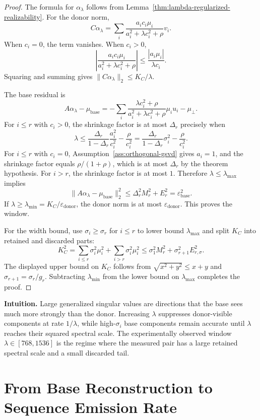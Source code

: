 \documentclass{article}
\theoremstyle{plain}
\theoremstyle{definition}
\theoremstyle{remark}
\begin{document}
\begin{proof}
The formula for $\alpha_\lambda$ follows from Lemma~\ref{thm:lambda-regularized-realizability}. For the donor norm,
\[
C\alpha_\lambda
=
\sum_i
\frac{a_ic_i\mu_i}{a_i^2+\lambda c_i^2+\rho}v_i.
\]
When $c_i=0$, the term vanishes. When $c_i>0$,
\[
\left|
\frac{a_ic_i\mu_i}{a_i^2+\lambda c_i^2+\rho}
\right|
\le
\frac{|a_i\mu_i|}{\lambda c_i}.
\]
Squaring and summing gives $\|C\alpha_\lambda\|_2\le K_C/\lambda$.

The base residual is
\[
A\alpha_\lambda-\mu_{\text{base}}
=
-
\sum_i
\frac{\lambda c_i^2+\rho}{a_i^2+\lambda c_i^2+\rho}\mu_i u_i
-
\mu_\perp.
\]
For $i\le r$ with $c_i>0$, the shrinkage factor is at most $\Delta_r$ precisely when
\[
\lambda
\le
\frac{\Delta_r}{1-\Delta_r}\frac{a_i^2}{c_i^2}-\frac{\rho}{c_i^2}
=
\frac{\Delta_r}{1-\Delta_r}\sigma_i^2-\frac{\rho}{c_i^2}.
\]
For $i\le r$ with $c_i=0$, Assumption~\ref{ass:orthogonal-gsvd} gives $a_i=1$, and the shrinkage factor equals $\rho/(1+\rho)$, which is at most $\Delta_r$ by the theorem hypothesis. For $i>r$, the shrinkage factor is at most $1$. Therefore $\lambda\le\lambda_{\max}$ implies
\[
\|A\alpha_\lambda-\mu_{\text{base}}\|_2^2
\le
\Delta_r^2M_r^2+E_r^2
=
\varepsilon_{\text{base}}^2.
\]
If $\lambda\ge\lambda_{\min}=K_C/\varepsilon_{\text{donor}}$, the donor norm is at most $\varepsilon_{\text{donor}}$. This proves the window.

For the width bound, use $\sigma_i\ge\sigma_r$ for $i\le r$ to lower bound $\lambda_{\max}$ and split $K_C$ into retained and discarded parts:
\[
K_C^2
=
\sum_{i\le r}\sigma_i^2\mu_i^2+
\sum_{i>r}\sigma_i^2\mu_i^2
\le
\sigma_1^2M_r^2+\sigma_{r+1}^2E_{r,\sigma}^2.
\]
The displayed upper bound on $K_C$ follows from $\sqrt{x^2+y^2}\le x+y$ and $\sigma_{r+1}=\sigma_r/g_r$. Subtracting $\lambda_{\min}$ from the lower bound on $\lambda_{\max}$ completes the proof.
\end{proof}

\noindent\textbf{Intuition.}
Large generalized singular values are directions that the base sees much more strongly than the donor. Increasing $\lambda$ suppresses donor-visible components at rate $1/\lambda$, while high-$\sigma_i$ base components remain accurate until $\lambda$ reaches their squared spectral scale. The experimentally observed window $\lambda\in[768,1536]$ is the regime where the measured pair has a large retained spectral scale and a small discarded tail.

\section{From Base Reconstruction to Sequence Emission Rate}
\label{app:base-reconstruction-to-ser}
\end{document}
